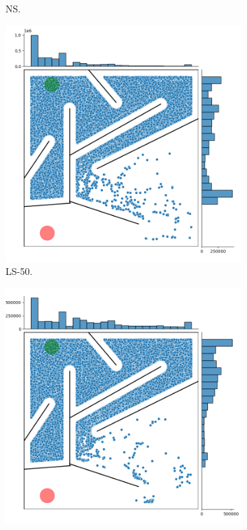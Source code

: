 \begin{figure}[H]
\begin{mdframed}
\begin{subfigure}[t]{0.5\textwidth}
            \caption{NS.}
        \end{subfigure}
        \begin{subfigure}[t]{0.5\textwidth}
            \includegraphics[scale=0.3]{resources/mazes/fitness_novelty_hard.png}
            \caption{LS-50.}
        \end{subfigure}
        \begin{subfigure}[t]{0.5\textwidth}
            \includegraphics[scale=0.3]{resources/mazes/dynamic_hard.png}

\end{subfigure}
\end{mdframed}
\end{figure}

